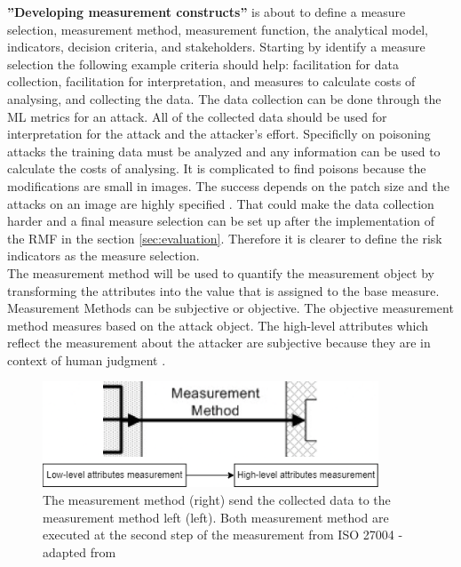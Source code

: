 \textbf{''Developing measurement constructs''} is about to define a measure selection, measurement method, measurement function, the analytical model, indicators, decision criteria, and stakeholders. Starting by identify a measure selection the following example criteria should help: facilitation for data collection, facilitation for interpretation, and measures to calculate costs of analysing, and collecting the data. The data collection can be done through the ML metrics for an attack. All of the collected data should be used for interpretation for the attack and the attacker's effort. Specificlly on poisoning attacks the training data must be analyzed and any information can be used to calculate the costs of analysing. It is complicated to find poisons because the modifications are small in images. The success depends on the patch size and the attacks on an image are highly specified \cite{DBLP:conf/icml/SchwarzschildGG21}. That could make the data collection harder and a final measure selection can be set up after the implementation of the RMF in the section \ref{sec:evaluation}. Therefore it is clearer to define the risk indicators as the measure selection. \\ The measurement method will be used to quantify the measurement object by transforming the attributes into the value that is assigned to the base measure. Measurement Methods can be subjective or objective. The objective measurement method measures based on the attack object. The high-level attributes which reflect the measurement about the attacker are subjective because they are in context of
human judgment \cite{DBLP:conf/crisis/DoynikovaNGK20}.

\begin{figure}[ht!]
  \centering
  \includegraphics[width=10cm]{pictures/measurement_methods.png}
  \caption{The measurement method (right) send the collected data to the measurement method left (left). Both measurement method are executed at the second step of the measurement from ISO 27004 -  adapted from \cite{ISO_27004_2009}}
  \label{fig:measurement_methods}
\end{figure}

